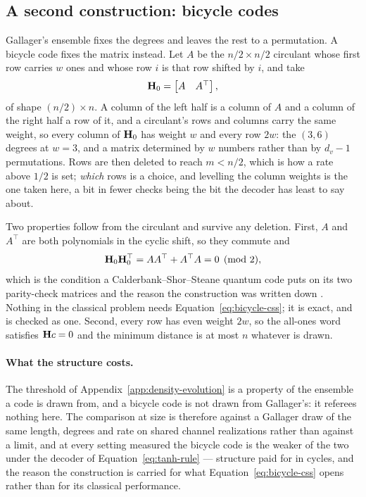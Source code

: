 \documentclass[11pt,a4paper]{article}
\begin{document}
\subsection{A second construction: bicycle codes}
\label{sec:ldpc:bicycle}
Gallager's ensemble fixes the degrees and leaves the rest to a permutation. A
bicycle code \citep{mackay2004} fixes the matrix instead. Let $A$ be the
$n/2 \times n/2$ circulant whose first row carries $w$ ones and whose row $i$
is that row shifted by $i$, and take
\begin{equation}
  \mathbf{H}_0 = \begin{bmatrix} A & A^{\top} \end{bmatrix},
  \label{eq:bicycle}
\end{equation}
of shape $(n/2) \times n$. A column of the left half is a column of $A$ and a
column of the right half a row of it, and a circulant's rows and columns carry
the same weight, so every column of $\mathbf{H}_0$ has weight $w$ and every row
$2w$: the $(3,6)$ degrees at $w = 3$, and a matrix determined by $w$ numbers
rather than by $d_v - 1$ permutations. Rows are then deleted to reach $m <
n/2$, which is how a rate above $1/2$ is set; \emph{which} rows is a choice,
and levelling the column weights is the one taken here, a bit in fewer checks
being the bit the decoder has least to say about.

Two properties follow from the circulant and survive any deletion. First, $A$
and $A^{\top}$ are both polynomials in the cyclic shift, so they commute and
\begin{equation}
  \mathbf{H}_0 \mathbf{H}_0^{\top} = A A^{\top} + A^{\top} A = 0 \pmod 2,
  \label{eq:bicycle-css}
\end{equation}
which is the condition a Calderbank--Shor--Steane quantum code puts on its two
parity-check matrices and the reason the construction was written down
\citep{mackay2004}. Nothing in the classical problem needs
Equation~\ref{eq:bicycle-css}; it is exact, and is checked as one.
Second, every row has even weight $2w$, so the all-ones word satisfies
$\mathbf{H} c = 0$ and the minimum distance is at most $n$ whatever is drawn.

\paragraph{What the structure costs.}
The threshold of Appendix~\ref{app:density-evolution} is a property of the
ensemble a code is drawn from, and a bicycle code is not drawn from Gallager's:
it referees nothing here. The comparison at size is therefore against a
Gallager draw of the same length, degrees and rate on shared channel
realizations rather than against a limit, and at every setting measured the
bicycle code is the weaker of the two under the decoder of
Equation~\ref{eq:tanh-rule} --- structure paid for in cycles, and the reason
the construction is carried for what Equation~\ref{eq:bicycle-css} opens
rather than for its classical performance.
\end{document}
